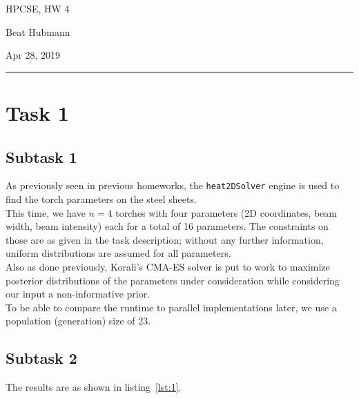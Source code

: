 \documentclass[11pt,a4paper]{article}
\begin{document}
\noindent\parbox{\linewidth}{
 \parbox{.25\linewidth}{\large HPCSE, HW 4}\hfill
 \parbox{.5\linewidth}{\begin{center} \large Beat Hubmann \end{center}}\hfill
 \parbox{.2\linewidth}{\begin{flushright} \large Apr 28, 2019 \end{flushright}}
}
\noindent\rule{\linewidth}{2pt}

\section{Task 1}
\subsection{Subtask 1}
As previously seen in previous homeworks, the \texttt{heat2DSolver} engine
is used to find the torch parameters on the steel sheets.\\
This time, we have $n=4$ torches with four parameters (2D coordinates, beam width, beam intensity)
each for a total of 16 parameters. The constraints on those are as given in the task description; without
any further information, uniform distributions are assumed for all parameters.\\
Also as done previously, Korali's CMA-ES solver is put to work to maximize posterior distributions of 
the parameters under consideration while considering our input a non-informative prior.\\
To be able to compare the runtime to parallel implementations later, we use a population (generation) size of 23.

\subsection{Subtask 2}
The results are as shown in listing~\ref{lst:1}.
\end{document}
